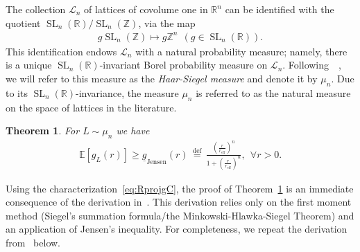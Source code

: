 \documentclass[article,doublecolumn]{IEEEtran}
\newcommand{\SL}{\operatorname{SL}}
\newcommand{\LL}{{\mathcal L}}
\newcommand{\df}{{\, \stackrel{\mathrm{def}}{=}\, }}
\newcommand{\R}{{\mathbb{R}}}
\newcommand{\Z}{{\mathbb{Z}}}
\newcommand{\reff}{{r_{\mathrm{eff}}}}
\newcommand{\VcdfL}{g_L}
\newcommand{\LBfo}{\underline{g}_{\mathrm{Jensen}}}
\newtheorem{thm}{Theorem}[section]
\begin{document}
The collection $\LL_n$ of lattices of covolume one in $\R^n$ can be identified with the quotient $\SL_n(\R)/\SL_n(\Z)$, via the map
\begin{align}
g \SL_n(\Z) \mapsto g \Z^n \ \  (g \in \SL_n(\R)).
\label{eq: mapsto}    
\end{align}
This identification endows $\LL_n$ with a natural probability
measure; namely, there is a unique $\SL_n(\R)$-invariant Borel
probability measure on $\LL_n$. Following~~\cite{ORW21}, we will refer to this measure as the
{\em Haar-Siegel measure} and denote it by
$\mu_n$. Due to its $\SL_n(\R)$-invariance, the measure $\mu_n$ is referred to as the natural measure on the space of lattices in the literature.

\begin{thm}
For $L\sim\mu_n$ we have 
\begin{align}
 \mathbb{E}[\VcdfL(r)]\geq \LBfo(r)\df\frac{\left(\frac{r}{\reff}\right)^{n}}{1+\left(\frac{r}{\reff}\right)^{n}},~~\forall r>0.
\label{eq:gLjesnenbound}
\end{align}
\label{thm:Jensen}
\end{thm}
Using the characterization~\eqref{eq:RprojgC}, the proof of Theorem~\ref{thm:Jensen} is an immediate consequence of the derivation in~\cite[Proof of Proposition 3.6]{ORW23}. This derivation relies only on the first moment method (Siegel's summation formula/the Minkowski-Hlawka-Siegel Theorem) and an application of Jensen's inequality. For completeness, we repeat the derivation from~\cite[Proof of Proposition 3.6]{ORW23} below.
\end{document}
